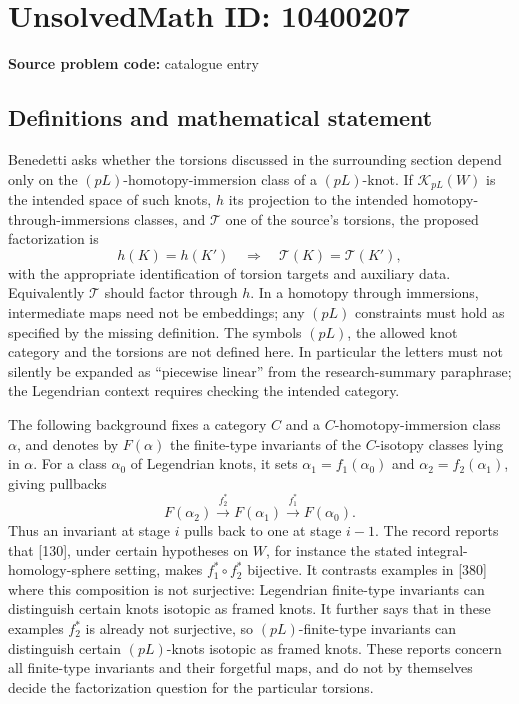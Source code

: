\documentclass[11pt]{article}
\begin{document}
\section*{UnsolvedMath ID: 10400207}
\textbf{Source problem code:} catalogue entry
\subsection{Definitions and mathematical statement}
Benedetti asks whether the torsions discussed in the surrounding section depend only on the \((pL)\)-homotopy-immersion class of a \((pL)\)-knot. If \(\mathcal K_{pL}(W)\) is the intended space of such knots, \(h\) its projection to the intended homotopy-through-immersions classes, and \(\mathcal T\) one of the source's torsions, the proposed factorization is
\[h(K)=h(K')\quad\Longrightarrow\quad\mathcal T(K)=\mathcal T(K'),\]
with the appropriate identification of torsion targets and auxiliary data. Equivalently \(\mathcal T\) should factor through \(h\). In a homotopy through immersions, intermediate maps need not be embeddings; any \((pL)\) constraints must hold as specified by the missing definition. The symbols \((pL)\), the allowed knot category and the torsions are not defined here. In particular the letters must not silently be expanded as ``piecewise linear'' from the research-summary paraphrase; the Legendrian context requires checking the intended category.

The following background fixes a category \(C\) and a \(C\)-homotopy-immersion class \(\alpha\), and denotes by \(F(\alpha)\) the finite-type invariants of the \(C\)-isotopy classes lying in \(\alpha\). For a class \(\alpha_0\) of Legendrian knots, it sets \(\alpha_1=f_1(\alpha_0)\) and \(\alpha_2=f_2(\alpha_1)\), giving pullbacks
\[F(\alpha_2)\xrightarrow{f_2^*}F(\alpha_1)\xrightarrow{f_1^*}F(\alpha_0).\]
Thus an invariant at stage \(i\) pulls back to one at stage \(i-1\). The record reports that [130], under certain hypotheses on \(W\), for instance the stated integral-homology-sphere setting, makes \(f_1^*\circ f_2^*\) bijective. It contrasts examples in [380] where this composition is not surjective: Legendrian finite-type invariants can distinguish certain knots isotopic as framed knots. It further says that in these examples \(f_2^*\) is already not surjective, so \((pL)\)-finite-type invariants can distinguish certain \((pL)\)-knots isotopic as framed knots. These reports concern all finite-type invariants and their forgetful maps, and do not by themselves decide the factorization question for the particular torsions.
\end{document}
